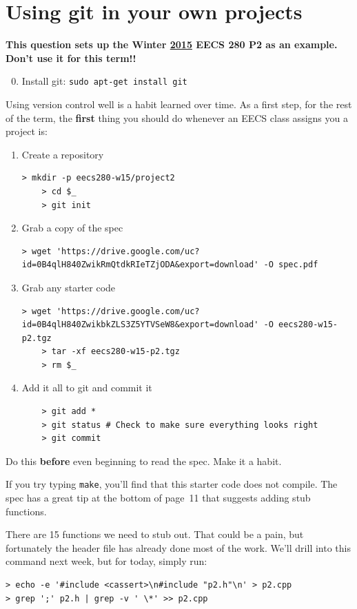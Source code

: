 \documentclass{article}
\begin{document}
\newpage
\section{Using git in your own projects}
\textbf{\color{red} This question sets up the Winter \ul{2015} EECS 280 P2 as
an example. Don't use it for this term!!}
\begin{enumerate}
    \setcounter{enumi}{-1}
  \item Install git: \texttt{sudo apt-get install git}
\end{enumerate}
\noindent
Using version control well is a habit learned over time. As a first step, for
the rest of the term, the \textbf{first} thing you should do whenever an EECS
class assigns you a project is:
\begin{enumerate}
  \item Create a repository
    \begin{Verbatim}[fontsize=\footnotesize]
    > mkdir -p eecs280-w15/project2
    > cd $_
    > git init
    \end{Verbatim}
  \item Grab a copy of the spec
    \begin{Verbatim}[fontsize=\footnotesize]
    > wget 'https://drive.google.com/uc?id=0B4qlH840ZwikRmQtdkRIeTZjODA&export=download' -O spec.pdf
    \end{Verbatim}
  \item Grab any starter code
    \begin{Verbatim}[fontsize=\footnotesize]
    > wget 'https://drive.google.com/uc?id=0B4qlH840ZwikbkZLS3Z5YTVSeW8&export=download' -O eecs280-w15-p2.tgz
    > tar -xf eecs280-w15-p2.tgz
    > rm $_
    \end{Verbatim}
  \item Add it all to git and commit it
    \begin{lstlisting}
    > git add *
    > git status # Check to make sure everything looks right
    > git commit
    \end{lstlisting}
\end{enumerate}
Do this \textbf{before} even beginning to read the spec. Make it a habit.

\medskip
\noindent
If you try typing \texttt{make}, you'll find that this starter code does not
compile. The spec has a great tip at the bottom of page~11 that suggests
adding stub functions.

\medskip
\noindent
There are 15 functions we need to stub out. That could be a pain, but
fortunately the header file has already done most of the work. We'll drill
into this command next week, but for today, simply run:
\begin{lstlisting}
> echo -e '#include <cassert>\n#include "p2.h"\n' > p2.cpp
> grep ';' p2.h | grep -v ' \*' >> p2.cpp
\end{lstlisting}
\end{document}
